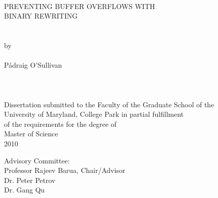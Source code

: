
\thispagestyle{empty}
\hbox{\ }
\vspace{1in}
\renewcommand{\baselinestretch}{1}
\small\normalsize
\begin{center}

\large{{PREVENTING BUFFER OVERFLOWS WITH\\
BINARY REWRITING}}\\
\ \\
\ \\
\large{by} \\
\ \\
\large{P\'{a}draig O'Sullivan}%
\ \\
\ \\
\ \\
\ \\
\normalsize
Dissertation submitted to the Faculty of the Graduate School of the \\
University of Maryland, College Park in partial fulfillment \\
of the requirements for the degree of \\
Master of Science \\
2010
\end{center}

\vspace{7.5em}

\noindent Advisory Committee: \\
Professor Rajeev Barua, Chair/Advisor \\
Dr. Peter Petrov \\
Dr. Gang Qu
